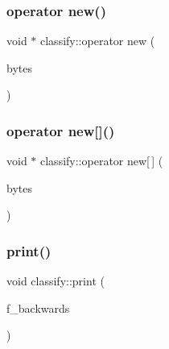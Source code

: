 \mbox{\label{classclassify_a8aff5842dba0201a8cfafff585e28afc}} 
\subsubsection{\texorpdfstring{operator new()}{operator new()}}
{\footnotesize\ttfamily void $\ast$ classify\+::operator new (\begin{DoxyParamCaption}\item[{size\+\_\+t}]{bytes }\end{DoxyParamCaption})}

\mbox{\label{classclassify_aae4d9bef04d19d137461fe20a1e9fa4d}} 
\subsubsection{\texorpdfstring{operator new[]()}{operator new[]()}}
{\footnotesize\ttfamily void $\ast$ classify\+::operator new\mbox{[}$\,$\mbox{]} (\begin{DoxyParamCaption}\item[{size\+\_\+t}]{bytes }\end{DoxyParamCaption})}

\mbox{\label{classclassify_a56d1941250d46f68a41566aac4331bc1}} 
\subsubsection{\texorpdfstring{print()}{print()}}
{\footnotesize\ttfamily void classify\+::print (\begin{DoxyParamCaption}\item[{\mbox{\hyperlink{galois_8h_a09fddde158a3a20bd2dcadb609de11dc}{I\+NT}}}]{f\+\_\+backwards }\end{DoxyParamCaption})}

\mbox{\label{classclassify_a9ca3960a8955968d2b0ef7beb4189d7b}} 
